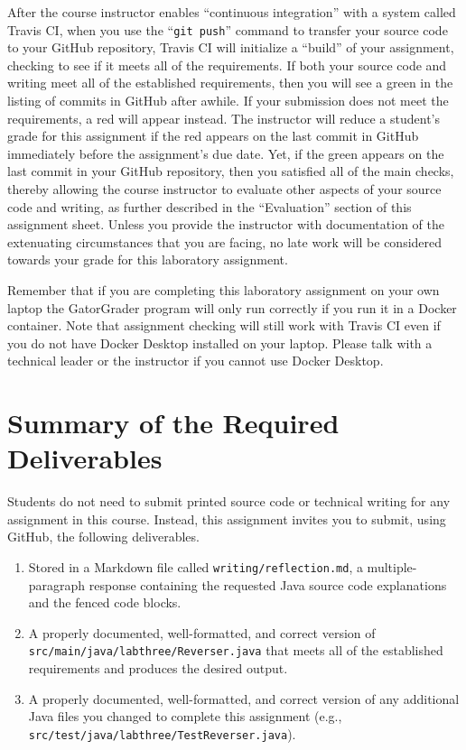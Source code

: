 \documentclass[11pt]{article}
\newcommand{\mainprogramsource}{\lstinline{src/main/java/labthree/Reverser.java}}
\newcommand{\testprogramsource}{\lstinline{src/test/java/labthree/TestReverser.java}}
\newcommand{\reflection}{\lstinline{writing/reflection.md}}
\newcommand{\gitpush}{\command{git push}}
\newcommand{\command}[1]{``\lstinline{#1}''}
\newcommand{\step}[1]{``{#1}''}
\newcommand{\checkmark}{\ding{51}}
\newcommand{\naughtmark}{\ding{55}}
\begin{document}
After the course instructor enables \step{continuous integration} with a system
called Travis CI, when you use the \gitpush{} command to transfer your source
code to your GitHub repository, Travis CI will initialize a \step{build} of your
assignment, checking to see if it meets all of the requirements. If both your
source code and writing meet all of the established requirements, then you will
see a green \checkmark{} in the listing of commits in GitHub after awhile. If
your submission does not meet the requirements, a red \naughtmark{} will appear
instead. The instructor will reduce a student's grade for this assignment if the
red \naughtmark{} appears on the last commit in GitHub immediately before the
assignment's due date. Yet, if the green \checkmark{} appears on the last commit
in your GitHub repository, then you satisfied all of the main checks, thereby
allowing the course instructor to evaluate other aspects of your source code and
writing, as further described in the \step{Evaluation} section of this
assignment sheet. Unless you provide the instructor with documentation of the
extenuating circumstances that you are facing, no late work will be considered
towards your grade for this laboratory assignment.

Remember that if you are completing this laboratory assignment on your own
laptop the GatorGrader program will only run correctly if you run it in a Docker
container.
%
Note that assignment checking will still work with Travis CI even if you do not
have Docker Desktop installed on your laptop.
%
Please talk with a technical leader or the instructor if you cannot use Docker
Desktop.

\section*{Summary of the Required Deliverables}

\noindent Students do not need to submit printed source code or technical
writing for any assignment in this course. Instead, this assignment invites you
to submit, using GitHub, the following deliverables.

\vspace*{-.075in}
\begin{enumerate}

  \setlength{\itemsep}{0in}

\item Stored in a Markdown file called \reflection{}, a multiple-paragraph
  response containing the requested Java source code explanations and the fenced
  code blocks.

\item A properly documented, well-formatted, and correct version of
  \mainprogramsource{} that meets all of the established requirements and
  produces the desired output.

\item A properly documented, well-formatted, and correct version of any
  additional Java files you changed to complete this assignment (e.g.,
  \testprogramsource{}).

\end{enumerate}
\vspace*{-.1in}
\end{document}
